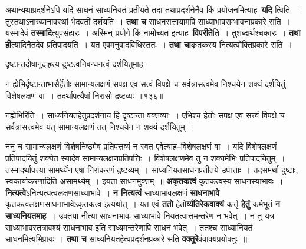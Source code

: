 \documentclass[article,12pt,a4paper]{memoir}
\begin{document}
	  \pstart अथान्यथाप्रदर्शनेऽपि यदि साधनं साध्यनियतं प्रतीयते तदा तथाप्रदर्शनेनैव किं प्रयोजनमित्याह--\textbf{यदि} त्विति । तुस्तथाऽनाख्यानावस्थां भेदवतीं दर्शयति । \textbf{तथा च} साधनसत्तायामपि साध्याभावसम्भावनाप्रकारे सति । यस्मादेवं \textbf{तस्मादि}त्युपसंहारः । अस्मिन् प्रयोगे किं नामोच्यत इत्याह--\textbf{विपरीते}ति । तुशब्दार्थश्चकारः । \textbf{तथा ही}त्यादिनैतदेव प्रतिपादयति । यत एवमनुवादविधिस्ततः । \textbf{तथा चा}कृतकस्य नित्यत्वोक्तिप्रकारे सति ।   \leavevmode{} 
	  
	दृष्टान्तदोषानुदाहृत्य दुष्टत्वनिबन्धनत्वं दर्शयितुमाह--  
	  
	न ह्येभिर्दृष्टान्ताभासैर्हेतोः सामान्यलक्षणं सपक्ष एव सत्वं विपक्षे च सर्वत्रासत्वमेव निश्चयेन शक्यं दर्शयितुं विशेषलक्षणं वा । तदर्थापत्यैषां निरासो द्रष्टव्यः ॥१३६॥ 
	  
	नह्येभिरिति । साध्यनियतहेतुप्रदर्शनाय हि दृष्टान्ता वक्तव्याः । एभिश्च हेतोः सपक्ष एव सत्त्वं विपक्षे च सर्वत्रासत्त्वमेव यत् सामान्यलक्षणं तत् निश्चयेन न शक्यं दर्शयितुम् ।  
	  
	ननु च सामान्यलक्षणं विशेषनिष्ठमेव प्रतिपत्तव्यं न स्वत एवेत्याह--विशेषलक्षणं वा । यदि विशेषलक्षणं प्रतिपादयितुं शक्येत स्यादेव सामान्यलक्षणप्रतिपत्तिः । विशेषलक्षणमेव तु न शक्यमेभिः प्रतिपादयितुम् । तस्मादर्थापत्त्या सामर्थ्येन एषां निराकरणं द्रष्टव्यम् । साध्यनियतसाधनप्रतीतये उपात्ताः । तदसमर्था दुष्टाः, स्वकार्याकरणादिति असामर्थ्यम् । इयता साधनमुक्तम् ॥ \textbf{अकृतकत्वं} कृतकत्वस्य साधनस्याभावः । \textbf{नित्यत्वे}ऽनित्यत्यत्वलक्षणसाध्याभावे । \textbf{न नित्यत्वं} साध्याभावलक्षणं \textbf{साधनाभावे} कृतकत्वलक्षणसाधनाभावेऽकृतकत्व इत्यर्थात् । यत एवं \textbf{ततो} हेतो\textbf{र्व्यतिरेकवाक्यं} कर्त्तृ \textbf{हेतुं} कर्मभूतं \textbf{न साध्यनियतमाह} । उक्तया नीत्या साधनाभावः साध्याभावे नियतत्वात्तमन्तरेण न भवेत् । न तु यत्र साध्याभावस्तत्रावश्यं साधनाभाव इति साध्यमन्तरेणापि साधनं भवेत् । ततश्च साध्यानियतं साधनमित्यभिप्रायः । \textbf{तथा च} साध्यनियतहेत्वप्रदर्शनप्रकारे सति \textbf{वक्तुरे}वंवाक्यप्रयोक्तुः ॥
	\pend
      
\end{document}
